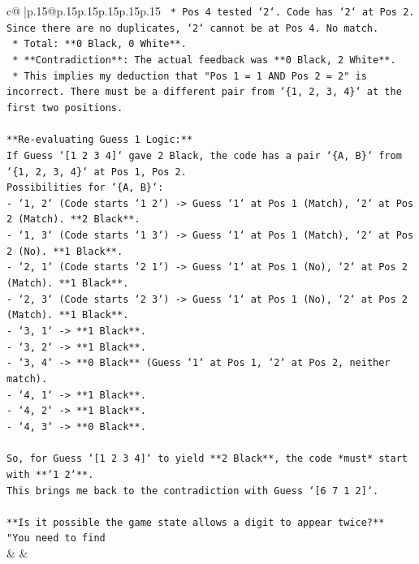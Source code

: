 \documentclass{article}
\begin{document}
{\begin{supertabular}{c@{$\;$}|p{.15\linewidth}@{}p{.15\linewidth}p{.15\linewidth}p{.15\linewidth}p{.15\linewidth}p{.15\linewidth}}
{{{\texttt{    *   Pos 4 tested `2`. Code has `2` at Pos 2. Since there are no duplicates, `2` cannot be at Pos 4. No match.} \\
\texttt{    *   Total: **0 Black, 0 White**.} \\
\texttt{    *   **Contradiction**: The actual feedback was **0 Black, 2 White**.} \\
\texttt{    *   This implies my deduction that "Pos 1 = 1 AND Pos 2 = 2" is incorrect. There must be a different pair from `\{1, 2, 3, 4\}` at the first two positions.} \\
\\ 
\texttt{**Re{-}evaluating Guess 1 Logic:**} \\
\texttt{If Guess `{[}1 2 3 4{]}` gave 2 Black, the code has a pair `\{A, B\}` from `\{1, 2, 3, 4\}` at Pos 1, Pos 2.} \\
\texttt{Possibilities for `\{A, B\}`:} \\
\texttt{{-} `1, 2` (Code starts `1 2`) {-}> Guess `1` at Pos 1 (Match), `2` at Pos 2 (Match). **2 Black**.} \\
\texttt{{-} `1, 3` (Code starts `1 3`) {-}> Guess `1` at Pos 1 (Match), `2` at Pos 2 (No). **1 Black**.} \\
\texttt{{-} `2, 1` (Code starts `2 1`) {-}> Guess `1` at Pos 1 (No), `2` at Pos 2 (Match). **1 Black**.} \\
\texttt{{-} `2, 3` (Code starts `2 3`) {-}> Guess `1` at Pos 1 (No), `2` at Pos 2 (Match). **1 Black**.} \\
\texttt{{-} `3, 1` {-}> **1 Black**.} \\
\texttt{{-} `3, 2` {-}> **1 Black**.} \\
\texttt{{-} `3, 4` {-}> **0 Black** (Guess `1` at Pos 1, `2` at Pos 2, neither match).} \\
\texttt{{-} `4, 1` {-}> **1 Black**.} \\
\texttt{{-} `4, 2` {-}> **1 Black**.} \\
\texttt{{-} `4, 3` {-}> **0 Black**.} \\
\\ 
\texttt{So, for Guess `{[}1 2 3 4{]}` to yield **2 Black**, the code *must* start with **`1 2`**.} \\
\texttt{This brings me back to the contradiction with Guess `{[}6 7 1 2{]}`.} \\
\\ 
\texttt{**Is it possible the game state allows a digit to appear twice?**} \\
\texttt{"You need to find} \\
            }
        }
    }
    & & \\ \\


\end{supertabular}}
\end{document}
